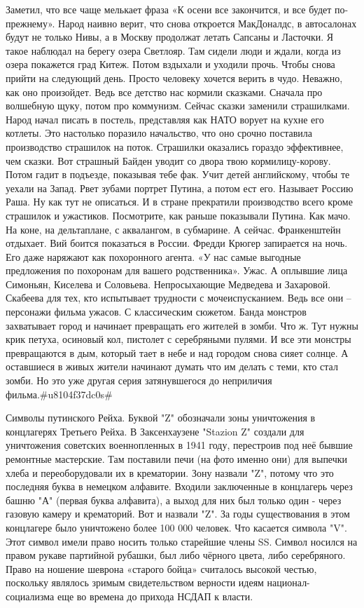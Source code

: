 Заметил, что все чаще мелькает фраза «К осени все закончится, и все будет по-прежнему». Народ наивно верит, что снова откроется МакДоналдс, в автосалонах будут не только Нивы, а в Москву продолжат летать Сапсаны и Ласточки.
Я такое наблюдал на берегу озера Светлояр. Там сидели люди и ждали, когда из озера покажется град Китеж. Потом вздыхали и уходили прочь. Чтобы снова прийти на следующий день. Просто человеку хочется верить в чудо. Неважно, как оно произойдет. Ведь все детство нас кормили сказками. Сначала про волшебную щуку, потом про коммунизм. Сейчас сказки заменили страшилками. Народ начал писать в постель, представляя как НАТО ворует на кухне его котлеты.
Это настолько поразило начальство, что оно срочно поставила производство страшилок на поток. Страшилки оказались гораздо эффективнее, чем сказки. Вот страшный Байден уводит со двора твою кормилицу-корову. Потом гадит в подъезде, показывая тебе фак. Учит детей английскому, чтобы те уехали на Запад. Рвет зубами портрет Путина, а потом ест его. Называет Россию Раша. Ну как тут не описаться.
И в стране прекратили производство всего кроме страшилок и ужастиков. Посмотрите, как раньше показывали Путина. Как мачо. На коне, на дельтаплане, с аквалангом, в субмарине. А сейчас. Франкенштейн отдыхает. Вий боится показаться в России. Фредди Крюгер запирается на ночь. Его даже наряжают как похоронного агента. «У нас самые выгодные предложения по похоронам для вашего родственника». Ужас.
А оплывшие лица Симоньян, Киселева и Соловьева. Непросыхающие Медведева и Захаровой. Скабеева для тех, кто испытывает трудности с мочеиспусканием. Ведь все они – персонажи фильма ужасов.
С классическим сюжетом. Банда монстров захватывает город и начинает превращать его жителей в зомби.
Что ж. Тут нужны крик петуха, осиновый кол, пистолет с серебряными пулями. И все эти монстры превращаются в дым, который тает в небе и над городом снова сияет солнце. А оставшиеся в живых жители начинают думать что им делать с теми, кто стал зомби. Но это уже другая серия затянувшегося до неприличия фильма.#u8104f37dc0s#

Символы путинского Рейха.
Буквой "Z" обозначали зоны уничтожения в концлагерях Третьего Рейха. В Заксенхаузене "Stazion Z" создали для уничтожения советских военнопленных в 1941 году, перестроив под неё бывшие ремонтные мастерские. Там поставили печи (на фото именно они) для выпечки хлеба и переоборудовали их в крематории. Зону назвали "Z", потому что это последняя буква в немецком алфавите. Входили заключенные в концлагерь через башню "А" (первая буква алфавита), а выход для них был только один - через газовую камеру и крематорий. Вот и назвали "Z". За годы существования в этом концлагере было уничтожено более 100 000 человек.
Что касается символа "V". Этот символ имели право носить только старейшие члены SS.
Символ носился на правом рукаве партийной рубашки, был либо чёрного цвета, либо серебряного. Право на ношение шеврона «старого бойца» считалось высокой честью, поскольку являлось зримым свидетельством верности идеям национал-социализма еще во времена до прихода НСДАП к власти.

